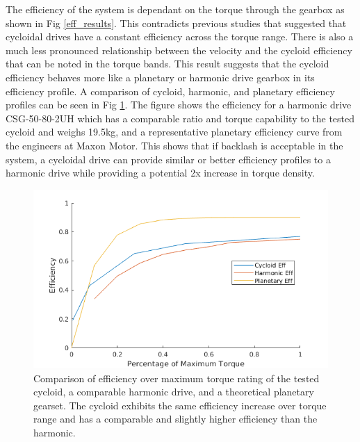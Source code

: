 The efficiency of the system is dependant on the torque through the gearbox as shown in Fig \ref{eff_results}.
This contradicts previous studies that suggested that cycloidal drives have a constant efficiency across the torque range.
There is also a much less pronounced relationship between the velocity and the cycloid efficiency that can be noted in the torque bands.
This result suggests that the cycloid efficiency behaves more like a planetary or harmonic drive gearbox in its efficiency profile.
A comparison of cycloid, harmonic, and planetary efficiency profiles can be seen in Fig \ref{eff_comp}.
The figure shows the efficiency for a harmonic drive CSG-50-80-2UH \cite{harmonic_sheet} which has a comparable ratio and torque capability to the tested cycloid and weighs 19.5kg, and a representative planetary efficiency curve from the engineers at Maxon Motor.
This shows that if backlash is acceptable in the system, a cycloidal drive can provide similar or better efficiency profiles to a harmonic drive while providing a potential 2x increase in torque density.

\begin{figure}[!b]
   \centering
   \includegraphics[width=\linewidth]{images/eff_comp_v2}
   \caption{Comparison of efficiency over maximum torque rating of the tested cycloid, a comparable harmonic drive, and a theoretical planetary gearset.
   The cycloid exhibits the same efficiency increase over torque range and has a comparable and slightly higher efficiency than the harmonic.}
   \label{eff_comp}
\end{figure}

